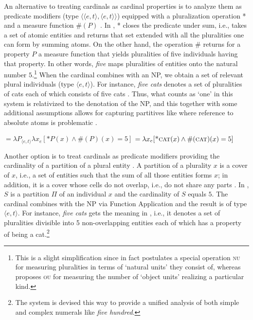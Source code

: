 \documentclass[output=paper]{langscibook}
\begin{document}
\noindent An alternative to treating cardinals as cardinal properties is to analyze them as predicate modifiers (type $\langle\langle e,t\rangle,\langle e,t\rangle\rangle$) equipped with a pluralization operation * and a measure function $\#(P)$ \citep{Krifka1989,krifka1995common}. In , * closes the predicate under sum, i.e., takes a set of atomic entities and returns that set extended with all the pluralities one can form by summing atoms. On the other hand, the operation $\#$ returns for a property $P$ a measure function that yields pluralities of five individuals having that property. In other words, \textit{five} maps pluralities of entities onto the natural number $5$.\footnote{This is a slight simplification since in fact \citet{Krifka1989} postulates a special operation \textsc{nu} for measuring pluralities in terms of `natural units' they consist of, whereas \citet{krifka1995common} proposes \textsc{ou} for measuring the number of `object units' realizing a particular kind.} When the cardinal combines with an NP, we obtain a set of relevant plural individuals (type $\langle e,t\rangle$). For instance, \textit{five cats} denotes a set of pluralities of cats each of which consists of five cats . Thus, what counts as `one' in this system is relativized to the denotation of the NP, and this together with some additional assumptions allows for capturing partitives like  where reference to absolute atoms is problematic \citep[see also][]{chierchia2010mass,wagiel2018subatomic}. 

	\ea \ea {} $=\lambda P_{\langle e,t\rangle} \lambda x_e[\text{*}P(x) \wedge \#(P)(x)=5]$\label{ex:five-modifier-krifka}
	\ex {} $=\lambda x_e[\textsc{*cat}(x) \wedge \#(\textsc{cat})(x)=5]$\label{ex:five-cats-modifier-krifka}
	\z
	\z

\noindent Another option is to treat cardinals as predicate modifiers providing the cardinality of a partition of a plural entity \citep{ionin_matushansky2006composition,ionin_matushansky2018cardinals}. A partition of a plurality $x$ is a cover of $x$, i.e., a set of entities such that the sum of all those entities forms $x$; in addition, it is a cover whose cells do not overlap, i.e., do not share any parts \citep[see][]{gillon1987readings,schwarzschild1996pluralities}. In , $S$ is a partition $\Pi$ of an individual $x$ and the cardinality of $S$ equals $5$. The cardinal combines with the NP via Function Application and the result is of type $\langle e,t\rangle$. For instance, \textit{five cats} gets the meaning in , i.e., it denotes a set of pluralities divisible into 5 non-overlapping entities each of which has a property of being a cat.\footnote{The system is devised this way to provide a unified analysis of both simple and complex numerals like \textit{five hundred}. %
}
\end{document}
